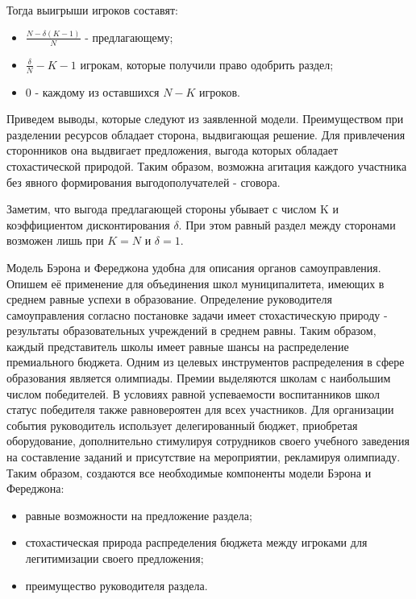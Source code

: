 Тогда выигрыши игроков составят:
\begin{itemize}
    \item $\frac{N-\delta(K-1)}{N}$ - предлагающему;
    \item $\frac{\delta}{N} - K-1$ игрокам, которые получили право одобрить раздел;
    \item $0$ -  каждому из оставшихся $N-K$ игроков.
\end{itemize}


Приведем выводы, которые следуют из заявленной модели. Преимуществом при разделении ресурсов обладает сторона, выдвигающая решение. Для привлечения сторонников она выдвигает предложения, выгода которых обладает стохастической природой. Таким образом, возможна агитация каждого участника без явного формирования выгодополучателей - сговора. 

Заметим, что выгода предлагающей стороны убывает с числом K и коэффициентом дисконтирования $\delta$. При этом равный раздел между сторонами возможен лишь при $K=N$ и $\delta=1$. 

Модель Бэрона и Фереджона удобна для описания органов самоуправления. Опишем её  применение для объединения школ муниципалитета, имеющих в среднем равные успехи в образование. Определение руководителя самоуправления согласно постановке задачи имеет стохастическую природу - результаты образовательных учреждений в среднем равны. Таким образом, каждый представитель школы имеет равные шансы на распределение премиального бюджета. Одним из целевых инструментов распределения в сфере образования является олимпиады. Премии выделяются школам с наибольшим числом победителей. В условиях равной успеваемости воспитанников школ статус победителя также равновероятен для всех участников. Для организации события руководитель использует делегированный бюджет, приобретая оборудование, дополнительно стимулируя сотрудников своего учебного заведения на составление заданий и присутствие на мероприятии, рекламируя олимпиаду. Таким образом, создаются все необходимые компоненты модели Бэрона и Фереджона:

\begin{itemize}
    \item равные возможности на предложение раздела;
    \item стохастическая природа распределения бюджета между игроками для легитимизации своего предложения;
    \item преимущество руководителя раздела.
\end{itemize}